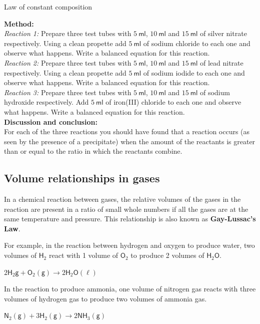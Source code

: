 \begin{Investigation}{Law of constant composition}
\begin{minipage}{.6\textwidth}
\begin{center}
{}
 \end{center}
\end{minipage}
\textbf{Method:}\\
\textsl{Reaction 1:} Prepare three test tubes with $5~\mathsf{ml}$, $10~\mathsf{ml}$ and $15~\mathsf{ml}$  of silver nitrate respectively. Using a clean propette add $5~\mathsf{ml}$ of sodium chloride to each one and observe what happens. Write a balanced equation for this reaction.\\
\textsl{Reaction 2:} Prepare three test tubes with $5~\mathsf{ml}$, $10~\mathsf{ml}$ and $15~\mathsf{ml}$  of lead nitrate respectively. Using a clean propette add $5~\mathsf{ml}$ of sodium iodide to each one and observe what happens. Write a balanced equation for this reaction.\\
\textsl{Reaction 3:} Prepare three test tubes with $5~\mathsf{ml}$, $10~\mathsf{ml}$ and $15~\mathsf{ml}$  of sodium hydroxide respectively. Add $5~\mathsf{ml}$ of iron(III) chloride to each one and observe what happens. Write a balanced equation for this reaction. \\
\textbf{Discussion and conclusion:} \\
For each of the three reactions you should have found that a reaction occurs (as seen by the presence of a precipitate) when the amount of the reactants is greater than or equal to the ratio in which the reactants combine.  
\end{Investigation}

    \label{m38711*cid7}
            \subsection*{Volume relationships in gases}
            \nopagebreak
      \label{m38711*id65179}In a chemical reaction between gases, the relative volumes of the gases in the reaction are present in a ratio of small whole numbers if all the gases are at the same temperature and pressure. This relationship is also known as \textbf{Gay-Lussac's Law}.\par 
      \label{m38711*id65189}For example, in the reaction between hydrogen and oxygen to produce water, two volumes of $\mathsf{H}{}_{2}$ react with 1 volume of $\mathsf{O}_{2}$ to produce 2 volumes of $\mathsf{H}_{2}\mathsf{O}$.\par 
      \label{m38711*id65237}$2\mathsf{H}_{2}\mathsf{g} +\mathsf{O}_{2} \mathsf{(g)} \to 2\mathsf{H}_{2}\mathsf{O} \mathsf{(\ell)}$\par 
      \label{m38711*id65282}In the reaction to produce ammonia, one volume of nitrogen gas reacts with three volumes of hydrogen gas to produce two volumes of ammonia gas.\par 
      \label{m38711*id65286}$\mathsf{N}_{2} \mathsf{(g)}+3\mathsf{H}_{2} \mathsf{(g)} \to 2\mathsf{NH}_{3} \mathsf{(g)}$
      \par  
    \label{m38711*cid8}
